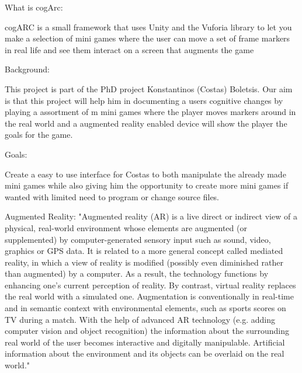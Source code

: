 What is cogArc:

cogARC is a small framework that uses Unity and the Vuforia library to let you make a selection of mini games where the user can move a set of frame markers in real life and see them interact on a screen that augments the game

Background:

This project is part of the PhD project Konstantinos (Costas) Boletsis. Our aim is that this project will help him in documenting a users cognitive changes by playing a assortment of m mini games where the player moves markers around in the real world and a augmented reality enabled device will show the player the goals for the game.


Goals:

Create a easy to use interface for Costas to both manipulate the already made mini games while also giving him the opportunity to create more mini games if wanted with limited need to program or change source files.

Augmented Reality:
"Augmented reality (AR) is a live direct or indirect view of a physical, real-world environment whose elements are augmented (or supplemented) by computer-generated sensory input such as sound, video, graphics or GPS data. It is related to a more general concept called mediated reality, in which a view of reality is modified (possibly even diminished rather than augmented) by a computer. As a result, the technology functions by enhancing one’s current perception of reality. By contrast, virtual reality replaces the real world with a simulated one. Augmentation is conventionally in real-time and in semantic context with environmental elements, such as sports scores on TV during a match. With the help of advanced AR technology (e.g. adding computer vision and object recognition) the information about the surrounding real world of the user becomes interactive and digitally manipulable. Artificial information about the environment and its objects can be overlaid on the real world."\cite{WikiAugmentedReality}
